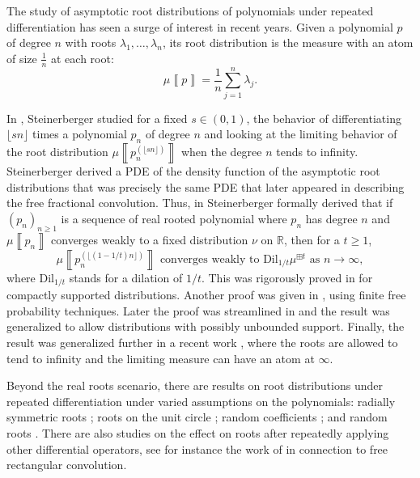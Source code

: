 \documentclass[reqno,11pt]{amsart}
\theoremstyle{remark}
\newcommand{\rr}{\mathbb{R}}
\newcommand{\dil}[1]{\mbox{Dil}_{#1}}
\newcommand{\meas}[1]{\mu \left\llbracket #1 \right\rrbracket}
\begin{document}
The study of asymptotic root distributions of polynomials under repeated differentiation has seen a surge of interest in recent years. Given a polynomial $p$ of degree $n$ with roots $\lambda_1,\dots, \lambda_n$, its root distribution is the measure with an atom of size $\tfrac{1}{n}$ at each root:
\begin{equation}
\label{eq:def.meas}
\meas{p}= \frac{1}{n}\sum_{j=1}^n \lambda_j.
\end{equation}


In \cite{steinerberger2019nonlocal}, Steinerberger studied for a fixed $s\in(0,1)$, the behavior of differentiating $\lfloor sn\rfloor$ times a polynomial $p_n$ of degree $n$ and looking at the limiting behavior of the root distribution $\meas{p_n^{(\lfloor sn\rfloor)}}$ when the degree $n$ tends to infinity. Steinerberger derived a PDE of the density function of the asymptotic root distributions that was precisely the same PDE that later appeared in \cite{shlyakhtenko2022fractional} describing the free fractional convolution. Thus, in \cite{steinerberger2023free} Steinerberger formally derived that if $ (p_n)_{n\geq 1} $ is a sequence of real rooted polynomial where $p_n$ has degree $n$ and $\meas{p_n}$ converges weakly to a fixed distribution $\nu$ on $\rr$, then for a $t\geq 1$, 
$$\meas{ p_n^{ (\lfloor (1-1/t)n\rfloor) }} \text{ converges weakly to }  \dil{1/t} \mu^{ \boxplus t } \text{ as } n\to \infty,$$ where $\dil{1/t}$ stands for a dilation of $1/t$. This was rigorously proved in \cite{hoskins2023dynamics} for compactly supported distributions. Another proof was given in \cite{arizmendi2023finite}, using finite free probability techniques. Later the proof was streamlined in \cite{arizmendi2024s} and the result was generalized to allow distributions with possibly unbounded support. Finally, the result was generalized further in a recent work \cite{jalowy2025zeros}, where the roots are allowed to tend to infinity and the limiting measure can have an atom at $\infty$. 

Beyond the real roots scenario, there are results on root distributions under repeated differentiation under varied assumptions on the polynomials: radially symmetric roots \cite{hoskins2023dynamics}; roots on the unit circle \cite{kabluchko2021repeated}; random coefficients \cite{hall2023roots,campbell2024fractional}; and random roots \cite{hoskins2022semicircle,arizmendi2025critical}. There are also studies on the effect on roots after repeatedly applying other differential operators, see for instance the work of \cite{campbell2024free} in connection to free rectangular convolution.
\end{document}
